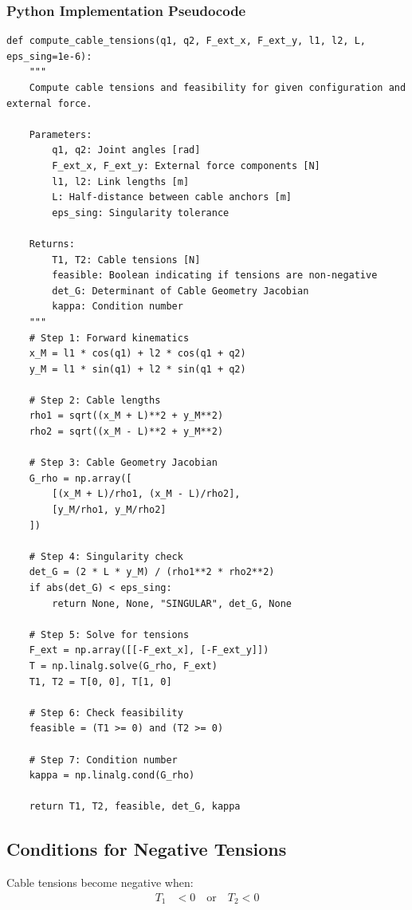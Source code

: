 \subsubsection{Python Implementation Pseudocode}

\begin{verbatim}
def compute_cable_tensions(q1, q2, F_ext_x, F_ext_y, l1, l2, L, eps_sing=1e-6):
    """
    Compute cable tensions and feasibility for given configuration and external force.
    
    Parameters:
        q1, q2: Joint angles [rad]
        F_ext_x, F_ext_y: External force components [N]
        l1, l2: Link lengths [m]
        L: Half-distance between cable anchors [m]
        eps_sing: Singularity tolerance
    
    Returns:
        T1, T2: Cable tensions [N]
        feasible: Boolean indicating if tensions are non-negative
        det_G: Determinant of Cable Geometry Jacobian
        kappa: Condition number
    """
    # Step 1: Forward kinematics
    x_M = l1 * cos(q1) + l2 * cos(q1 + q2)
    y_M = l1 * sin(q1) + l2 * sin(q1 + q2)
    
    # Step 2: Cable lengths
    rho1 = sqrt((x_M + L)**2 + y_M**2)
    rho2 = sqrt((x_M - L)**2 + y_M**2)
    
    # Step 3: Cable Geometry Jacobian
    G_rho = np.array([
        [(x_M + L)/rho1, (x_M - L)/rho2],
        [y_M/rho1, y_M/rho2]
    ])
    
    # Step 4: Singularity check
    det_G = (2 * L * y_M) / (rho1**2 * rho2**2)
    if abs(det_G) < eps_sing:
        return None, None, "SINGULAR", det_G, None
    
    # Step 5: Solve for tensions
    F_ext = np.array([[-F_ext_x], [-F_ext_y]])
    T = np.linalg.solve(G_rho, F_ext)
    T1, T2 = T[0, 0], T[1, 0]
    
    # Step 6: Check feasibility
    feasible = (T1 >= 0) and (T2 >= 0)
    
    # Step 7: Condition number
    kappa = np.linalg.cond(G_rho)
    
    return T1, T2, feasible, det_G, kappa
\end{verbatim}

\subsection{Conditions for Negative Tensions}
Cable tensions become negative when:
\begin{align}
T_1 &< 0 \quad \text{or} \quad T_2 < 0
\end{align}

